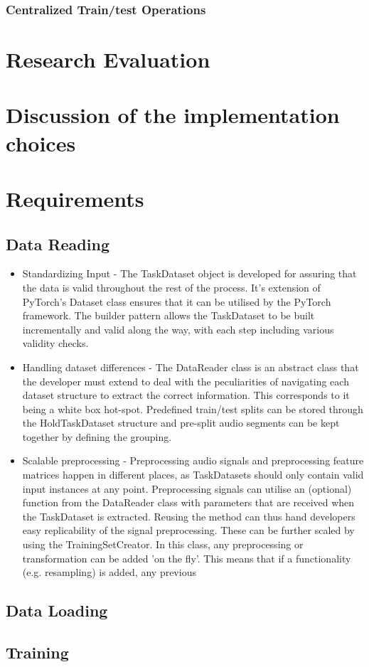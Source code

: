 \subsubsection{Centralized Train/test Operations}
\section{Research Evaluation}
\section{Discussion of the implementation choices}
\section{Requirements}
\subsection{Data Reading}
\begin{itemize}
	\item Standardizing Input - The TaskDataset object is developed for assuring that the data is valid throughout the rest of the process. It's extension of PyTorch's Dataset class ensures that it can be utilised by the PyTorch framework. The builder pattern allows the TaskDataset to be built incrementally and valid along the way, with each step including various validity checks.
	\item Handling dataset differences - The DataReader class is an abstract class that the developer must extend to deal with the peculiarities of navigating each dataset structure to extract the correct information. This corresponds to it being a white box hot-spot. Predefined train/test splits can be stored through the HoldTaskDataset structure and pre-split audio segments can be kept together by defining the grouping. 
	\item Scalable preprocessing - Preprocessing audio signals and preprocessing feature matrices happen in different places, as TaskDatasets should only contain valid input instances at any point. Preprocessing signals can utilise an (optional) function from the DataReader class with parameters that are received when the TaskDataset is extracted. Reusing the method can thus hand developers easy replicability of the signal preprocessing. These can be further scaled by using the TrainingSetCreator. In this class, any preprocessing or transformation can be added 'on the fly'. This means that if a functionality (e.g. resampling) is added, any previous 
\end{itemize}
\subsection{Data Loading}
\subsection{Training}